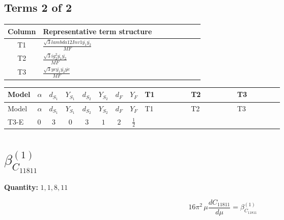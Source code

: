 \documentclass[8pt]{article}
\begin{document}
\begin{landscape}
\subsection*{Terms 2 of 2}
\begin{center}
\begin{tabular}{@{}c >{\raggedright\arraybackslash}p{0.82\linewidth}@{}}
\toprule
Column & Representative term structure \\
\midrule
T1 & \(\displaystyle \frac{\sqrt{3} lambda12Inv1 \overline{y_{1}} \overline{y_{2}}}{MF}\) \\
\midrule
T2 & \(\displaystyle \frac{\sqrt{3} i g_{2}^{2} \overline{y_{1}} \overline{y_{2}}}{MF}\) \\
\midrule
T3 & \(\displaystyle \frac{\sqrt{3} ye \overline{y_{1}} \overline{y_{2}} \overline{ye}}{MF}\) \\
\midrule
\bottomrule
\end{tabular}
\end{center}
\smallskip
\tiny
\begin{longtable}{@{}llcccccc >{\raggedright\arraybackslash}p{0.21\linewidth} >{\raggedright\arraybackslash}p{0.21\linewidth} >{\raggedright\arraybackslash}p{0.21\linewidth}@{}}
\toprule
Model & $\alpha$ & $d_{S_1}$ & $Y_{S_1}$ & $d_{S_2}$ & $Y_{S_2}$ & $d_F$ & $Y_F$ & T1 & T2 & T3 \\
\midrule
\endfirsthead
\toprule
Model & $\alpha$ & $d_{S_1}$ & $Y_{S_1}$ & $d_{S_2}$ & $Y_{S_2}$ & $d_F$ & $Y_F$ & T1 & T2 & T3 \\
\midrule
\endhead
T3-E & $0$ & $3$ & $0$ & $3$ & $1$ & $2$ & $\frac{1}{2}$ & \scriptsize\adjustbox{max width=\linewidth}{$\begin{gathered} \frac{\sqrt{3} lambda12Inv1 \overline{y_{1}} \overline{y_{2}}}{6 MF}\end{gathered}$} & \scriptsize\adjustbox{max width=\linewidth}{$\begin{gathered} \frac{\sqrt{3} i g_{2}^{2} \overline{y_{1}} \overline{y_{2}}}{6 MF}\end{gathered}$} & \scriptsize\adjustbox{max width=\linewidth}{$\begin{gathered} \frac{\sqrt{3} ye \overline{y_{1}} \overline{y_{2}} \overline{ye}}{12 MF}\end{gathered}$} \\
\midrule
\bottomrule
\end{longtable}
\clearpage
\section*{$\beta_{C_{11811}}^{(1)}$}
\noindent\textbf{Quantity: }$\mathrm{1,1,8,11}$\par\smallskip
\[16\pi^2\,\mu\frac{d C_{11811}}{d\mu}=\beta_{C_{11811}}^{(1)}\]

\end{landscape}
\end{document}
